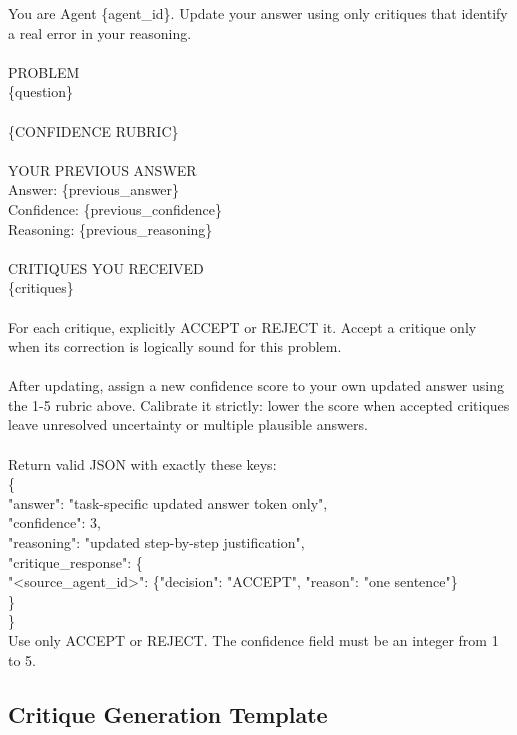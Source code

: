 \begin{prompt}
You are Agent \{agent\_id\}. Update your answer using only critiques that identify a real error in your reasoning.\\
\\
PROBLEM\\
\{question\}\\
\\
\{CONFIDENCE RUBRIC\}\\
\\
YOUR PREVIOUS ANSWER\\
Answer: \{previous\_answer\}\\
Confidence: \{previous\_confidence\}\\
Reasoning: \{previous\_reasoning\}\\
\\
CRITIQUES YOU RECEIVED\\
\{critiques\}\\
\\
For each critique, explicitly ACCEPT or REJECT it. Accept a critique only when its correction is logically sound for this problem.\\
\\
After updating, assign a new confidence score to your own updated answer using the 1-5 rubric above. Calibrate it strictly: lower the score when accepted critiques leave unresolved uncertainty or multiple plausible answers.\\
\\
Return valid JSON with exactly these keys:\\
\{\\
\quad "answer": "task-specific updated answer token only",\\
\quad "confidence": 3,\\
\quad "reasoning": "updated step-by-step justification",\\
\quad "critique\_response": \{\\
\quad\quad "<source\_agent\_id>": \{"decision": "ACCEPT", "reason": "one sentence"\}\\
\quad \}\\
\}\\
Use only ACCEPT or REJECT. The confidence field must be an integer from 1 to 5.
\end{prompt}

\subsection{Critique Generation Template}

